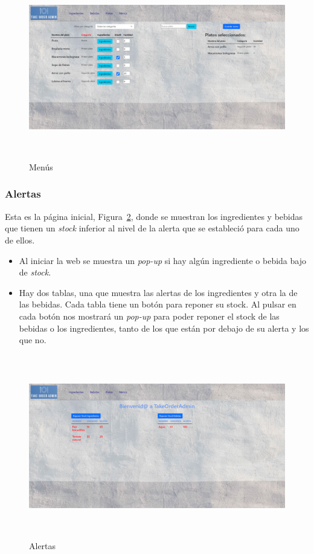 \begin{figure}[h]
    \centering
    \includegraphics[width=15cm, height=8cm]{Imagenes/Figuras/menus.png} 
   \caption{Menús \label{fig:menus}}
\end{figure}

\subsubsection*{Alertas}
Esta es la página inicial, Figura~\ref{fig:alertas}, donde se muestran los ingredientes y bebidas que tienen un \textit{stock} inferior al nivel de la alerta que se estableció para cada uno de ellos.

\begin{itemize} 

\item Al iniciar la web se muestra un \textit{pop-up} si hay algún ingrediente o bebida bajo de \textit{stock}. 

\item Hay dos tablas, una que muestra las alertas de los ingredientes y otra la de las bebidas. Cada tabla tiene un botón para reponer su stock. Al pulsar en cada botón nos mostrará un \textit{pop-up} para poder reponer el stock de las bebidas o los ingredientes, tanto de los que están por debajo de su alerta y los que no.

\end{itemize}


\begin{figure}[h]
    \centering
    \includegraphics[width=15cm, height=8cm]{Imagenes/Figuras/alertas.png} 
   \caption{Alertas \label{fig:alertas}}
\end{figure}



 


